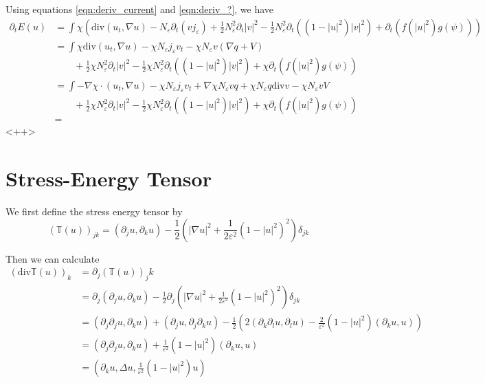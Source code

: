 \documentclass[a4paper]{article}
\renewcommand{\div}{\mathrm{div}}
\begin{document}
Using equations \eqref{eqn:deriv_current} and \eqref{eqn:deriv_?}, we have
\begin{align}
  \partial_t E(u) &= \int \chi \left( \div (u_t, \nabla u) - N_\varepsilon \partial_t(v j_\varepsilon) + \frac{1}{2} N_\varepsilon^2 \partial_t |v|^2
  - \frac{1}{2} N_\varepsilon^2 \partial_t \left( (1-|u|^2) |v|^2 \right) + \partial_t (f(|u|^2)g(\psi)) \right) \nonumber \\
  &= \int \chi \div(u_t,\nabla u) - \chi N_\varepsilon j_\varepsilon v_t - \chi N_\varepsilon v (\nabla q + V) \nonumber \\
  &\quad \quad + \frac{1}{2} \chi N_\varepsilon^2 \partial_t |v|^2 - \frac{1}{2} \chi N_\varepsilon^2 \partial_t( (1-|u|^2)|v|^2) + \chi \partial_t(
  f(|u|^2) g(\psi)) \nonumber \\
  &= \int - \nabla \chi \cdot (u_t, \nabla u) - \chi N_\varepsilon j_\varepsilon v_t + \nabla \chi N_\varepsilon v q + \chi N_\varepsilon q \div v -
  \chi N_\varepsilon v V \nonumber \\
  &\quad \quad + \frac{1}{2} \chi N_\varepsilon^2 \partial_t |v|^2 - \frac{1}{2} \chi N_\varepsilon^2 \partial_t( (1-|u|^2)|v|^2) + \chi \partial_t(
  f(|u|^2) g(\psi)) \nonumber \\
  &=
  \label{eqn:deriv_energy}
\end{align}<++>

\section{Stress-Energy Tensor}
We first define the stress energy tensor by
\begin{equation}
  (\mathbb{T}(u))_{jk} = (\partial_j u, \partial_k u) - \frac{1}{2} \left( |\nabla u|^2 + \frac{1}{2 \varepsilon^2} (1 - |u|^2)^2 \right) \delta_{jk}
  \label{eqn:stress_energy}
\end{equation}

Then we can calculate
\begin{align}
  (\div \mathbb{T}(u))_k &= \partial_j (\mathbb{T}(u))_jk \nonumber \\
  &= \partial_j (\partial_j u, \partial_k u) - \frac{1}{2} \partial_j \left( |\nabla u|^2 + \frac{1}{2 \varepsilon^2} ( 1 - |u|^2)^2 \right)
  \delta_{jk} \nonumber \\
  &= (\partial_j \partial_j u, \partial_k u) + (\partial_j u, \partial_j \partial_k u) - \frac{1}{2} \left( 2( \partial_k \partial_l u, \partial_l u)
  - \frac{2}{\varepsilon^2} (1- |u|^2) (\partial_k u, u) \right) \nonumber \\
  &= (\partial_j \partial_j u, \partial_k u) + \frac{1}{\varepsilon^2} (1-|u|^2) (\partial_k u, u) \nonumber \\
  &= ( \partial_k u, \Delta u, \frac{1}{\varepsilon^2} (1 - |u|^2)u)
  \label{eqn:div_stress_energy_comp}
\end{align}
\end{document}

